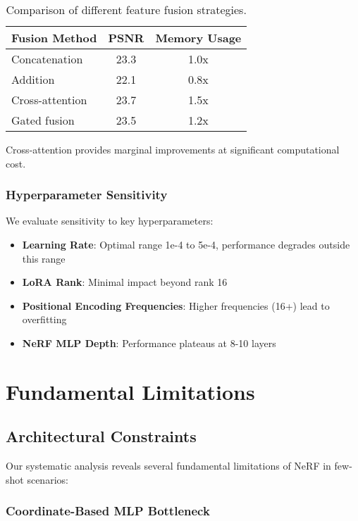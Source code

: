 \documentclass[11pt]{article}
\begin{document}
\begin{table}[h]
\centering
\begin{tabular}{lcc}
\toprule
Fusion Method & PSNR & Memory Usage \\
\midrule
Concatenation & 23.3 & 1.0x \\
Addition & 22.1 & 0.8x \\
Cross-attention & 23.7 & 1.5x \\
Gated fusion & 23.5 & 1.2x \\
\bottomrule
\end{tabular}
\caption{Comparison of different feature fusion strategies.}
\label{tab:fusion_strategies}
\end{table}

Cross-attention provides marginal improvements at significant computational cost.

\subsubsection{Hyperparameter Sensitivity}

We evaluate sensitivity to key hyperparameters:

\begin{itemize}
    \item \textbf{Learning Rate}: Optimal range 1e-4 to 5e-4, performance degrades outside this range
    \item \textbf{LoRA Rank}: Minimal impact beyond rank 16
    \item \textbf{Positional Encoding Frequencies}: Higher frequencies (16+) lead to overfitting
    \item \textbf{NeRF MLP Depth}: Performance plateaus at 8-10 layers
\end{itemize}

\section{Fundamental Limitations}

\subsection{Architectural Constraints}

Our systematic analysis reveals several fundamental limitations of NeRF in few-shot scenarios:

\subsubsection{Coordinate-Based MLP Bottleneck}
\end{document}

